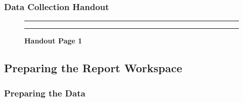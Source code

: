 \documentclass[]{article}
\begin{document}
\subsubsection{Data Collection Handout}
\label{sec:appendix-data-handout}

\begin{figure}[!ht]
    \hrule
    \caption{ \textbf{Handout Page 1} }
    \begin{center}
    \end{center}
    \label{fig:handout-1}
    \hrule
\end{figure}

\newpage

\subsection{Preparing the Report Workspace}
\label{sec:appendix-setup}

\subsubsection{Preparing the Data}
\label{sec:appendix-data-prep}
\end{document}
